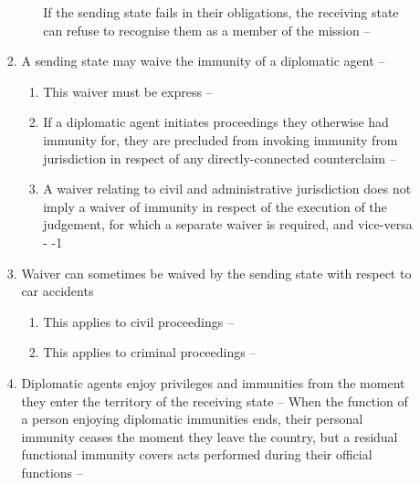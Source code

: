 \begin{enumerate}
\begin{enumerate}
\begin{enumerate}
\begin{enumerate}
                If the sending state fails in their obligations, the receiving state can refuse to recognise them as a member of the mission -- 
            \end{enumerate}
            \item A sending state may waive the immunity of a diplomatic agent -- 
            \begin{enumerate}
                \item This waiver must be express -- 
                \item If a diplomatic agent initiates proceedings they otherwise had immunity for, they are precluded from invoking immunity from jurisdiction in respect of any directly-connected counterclaim -- 
                \item A waiver relating to civil and administrative jurisdiction does not imply a waiver of immunity in respect of the execution of the judgement, for which a separate waiver is required, and vice-versa - -1
            \end{enumerate}
            \item Waiver can sometimes be waived by the sending state with respect to car accidents
            \begin{enumerate}
                \item This applies to civil proceedings -- 
                \item This applies to criminal proceedings -- 
            \end{enumerate}
            \item Diplomatic agents enjoy privileges and immunities from the moment they enter the territory of the receiving state -- 
            When the function of a person enjoying diplomatic immunities ends, their personal immunity ceases the moment they leave the country, but a residual functional immunity covers acts performed during their official functions -- 
        \end{enumerate}
    \end{enumerate}
\end{enumerate}

